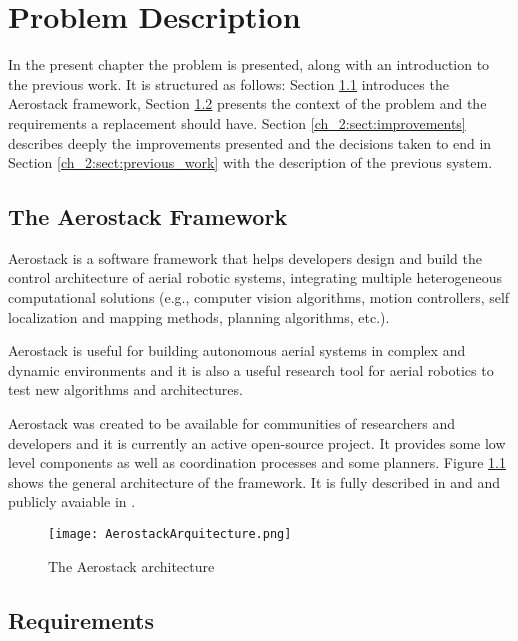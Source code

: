 \chapter{Problem Description}

In the present chapter the problem is presented, along with an introduction to the previous work. It is structured as follows: Section \ref{ch_2:sect:aerostack} introduces the Aerostack framework, Section \ref{ch_2:sect:requirements} presents the context of the problem and the requirements a replacement should have. Section \ref{ch_2:sect:improvements} describes deeply the improvements presented and the decisions taken to end in Section \ref{ch_2:sect:previous_work} with the description of the previous system.

  \section{The Aerostack Framework} \label{ch_2:sect:aerostack}

    Aerostack is a software framework that helps developers design and build the control architecture of aerial robotic systems, integrating multiple heterogeneous computational solutions (e.g., computer vision algorithms, motion controllers, self localization and mapping methods, planning algorithms, etc.).

    Aerostack is useful for building autonomous aerial systems in complex and dynamic environments and it is also a useful research tool for aerial robotics to test new algorithms and architectures.

    Aerostack was created to be available for communities of researchers and developers and it is currently an active open-source project. It provides some low level components as well as coordination processes and some planners. Figure \ref{ch_2:fig:aerostack_arqu} shows the general architecture of the framework. It is fully described in \cite{7502591} and \cite{Sanchez-Lopez2017} and publicly avaiable in \cite{aerostack_wiki_web}.

    \begin{figure}[ht]
      \centering
      \texttt{[image: AerostackArquitecture.png]}
      \caption{The Aerostack architecture}
      \label{ch_2:fig:aerostack_arqu}
    \end{figure}

  \section{Requirements} \label{ch_2:sect:requirements}

